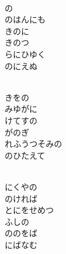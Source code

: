 \documentclass[10pt,b5j]{tarticle} %
\begin{document}
\vspace{1.5em} %
\newcommand{\linespace}{0.5em} %
\newcommand{\blocksize}{0.5\hsize} %
\newcommand{\itemmargin}{3em} %
\begin{enumerate} %
    \setlength{\itemindent}{\itemmargin} %
    \begin{minipage}[c]{\blocksize}
    
        \vspace{\linespace}
        \item~\\
        の\\
        のはんにも\\
        きのに\\
        きのつ\\
        らにひゆく\\
        のにえぬ
        
    \end{minipage}
    \begin{minipage}[c]{\blocksize}
        
        \vspace{\linespace}
        \item~\\
        きをの\\
        みゆがに\\
        けてすの\\
        がのぎ\\
        れふうつそみの\\
        のひたえて
        
    \end{minipage}
    \begin{minipage}[c]{\blocksize}
        
        \vspace{\linespace}
        \item~\\
        にくやの\\
        のければ\\
        とにをせめつ\\
        ふしの\\
        ののをば\\
        にばなむ
        

\end{minipage}
\end{enumerate}
\end{document}
